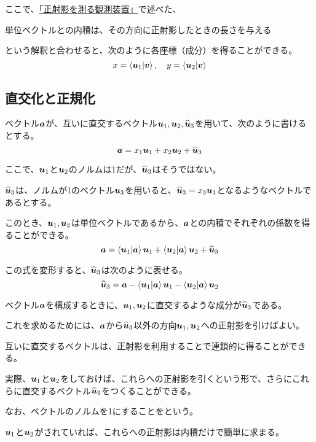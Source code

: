 \documentclass[../../../topic_linear-algebra]{subfiles}
\begin{document}
ここで、\hyperref[sec:orthogonal-projection-measurement]{「正射影を測る観測装置」}で述べた、
\begin{emphabox}
  \begin{spacebox}
    \begin{center}
      単位ベクトルとの内積は、その方向に正射影したときの長さを与える
    \end{center}
  \end{spacebox}
\end{emphabox}
という解釈と合わせると、次のように各座標（成分）を得ることができる。
\begin{equation*}
  x = \braket{\vb*{u}_1|\vb*{v}}, \quad y = \braket{\vb*{u}_2|\vb*{v}}
\end{equation*}

\subsection{直交化と正規化}

ベクトル$\vb*{a}$が、互いに直交するベクトル$\vb*{u}_1, \vb*{u}_2, \widehat{\vb*{u}}_3$を用いて、次のように書けるとする。
\begin{equation*}
  \vb*{a} = x_1\vb*{u}_1 + x_2\vb*{u}_2 + \widehat{\vb*{u}}_3
\end{equation*}

ここで、$\vb*{u}_1$と$\vb*{u}_2$のノルムは1だが、$\widehat{\vb*{u}}_3$はそうではない。

$\widehat{\vb*{u}}_3$は、ノルムが1のベクトル$\vb*{u}_3$を用いると、$\widehat{\vb*{u}}_3 = x_3 \vb*{u}_3$となるようなベクトルであるとする。

\br

このとき、$\vb*{u}_1, \vb*{u}_2$は単位ベクトルであるから、$\vb*{a}$との内積でそれぞれの係数を得ることができる。
\begin{equation*}
  \vb*{a} = \braket{\vb*{u}_1|\vb*{a}} \vb*{u}_1 + \braket{\vb*{u}_2|\vb*{a}} \vb*{u}_2 + \widehat{\vb*{u}}_3
\end{equation*}

この式を変形すると、$\widehat{\vb*{u}}_3$は次のように表せる。
\begin{equation*}
  \widehat{\vb*{u}}_3 = \vb*{a} - \braket{\vb*{u}_1|\vb*{a}} \vb*{u}_1 - \braket{\vb*{u}_2|\vb*{a}} \vb*{u}_2
\end{equation*}

ベクトル$\vb*{a}$を構成するときに、$\vb*{u}_1,\vb*{u}_2$に直交するような成分が$\widehat{\vb*{u}}_3$である。

これを求めるためには、$\vb*{a}$から$\widehat{\vb*{u}}_3$以外の方向$\vb*{u}_1,\vb*{u}_2$への正射影を引けばよい。

\br

互いに直交するベクトルは、正射影を利用することで連鎖的に得ることができる。

実際、$\vb*{u}_1$と$\vb*{u}_2$をしておけば、これらへの正射影を引くという形で、さらにこれらに直交するベクトル$\widehat{\vb*{u}}_3$をつくることができる。

\br

なお、ベクトルのノルムを1にすることをという。

$\vb*{u}_1$と$\vb*{u}_2$がされていれば、これらへの正射影は内積だけで簡単に求まる。
\end{document}
